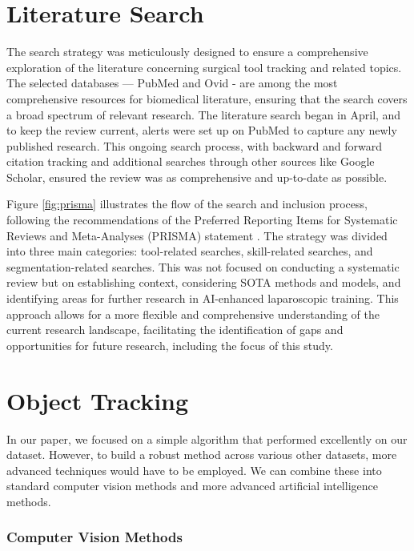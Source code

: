 \section{Literature Search}

The search strategy was meticulously designed to ensure a comprehensive exploration of the literature concerning surgical tool tracking and related topics. The selected databases — PubMed and Ovid - are among the most comprehensive resources for biomedical literature, ensuring that the search covers a broad spectrum of relevant research. The literature search began in April, and to keep the review current, alerts were set up on PubMed to capture any newly published research. This ongoing search process, with backward and forward citation tracking and additional searches through other sources like Google Scholar, ensured the review was as comprehensive and up-to-date as possible.

Figure \ref{fig:prisma} illustrates the flow of the search and inclusion process, following the recommendations of the Preferred Reporting Items for Systematic Reviews and Meta-Analyses (PRISMA) statement \cite{moher_preferred_2010}. The strategy was divided into three main categories: tool-related searches, skill-related searches, and segmentation-related searches. This was not focused on conducting a systematic review but on establishing context, considering SOTA methods and models, and identifying areas for further research in AI-enhanced laparoscopic training. This approach allows for a more flexible and comprehensive understanding of the current research landscape, facilitating the identification of gaps and opportunities for future research, including the focus of this study.

\section{Object Tracking}

In our paper, we focused on a simple algorithm that performed excellently on our dataset. However, to build a robust method across various other datasets, more advanced techniques would have to be employed. We can combine these into standard computer vision methods and more advanced artificial intelligence methods.

\subsubsection{Computer Vision Methods}

